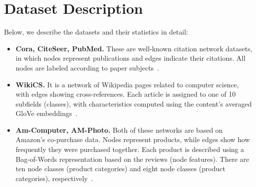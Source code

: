 \section{Dataset Description}
\label{sec:dataset}
Below, we describe the datasets and their statistics in detail:
\begin{itemize}
    \item
    \textbf{Cora, CiteSeer, PubMed.} These are well-known citation network datasets, in which nodes represent publications and edges indicate their citations. All nodes are labeled according to paper subjects~.
    \item 
    
    \textbf{WikiCS.} It is a network of  Wikipedia pages related to computer science, with edges showing cross-references. Each article is assigned to one of 10 subfields (classes), with characteristics computed using the content's averaged GloVe embeddings~.
    \item 
    
    \textbf{Am-Computer, AM-Photo.} Both of these networks are based on Amazon's co-purchase data. Nodes represent products, while edges show how frequently they were purchased together. Each product is described using a Bag-of-Words representation based on the reviews (node features). There are ten node classes (product categories) and eight node classes (product categories), respectively~.
    
\end{itemize}
\begin{table}[h]
\caption{The dataset statistics.}
\label{tab:DatasetStats}
\centering
{}
\end{table}


